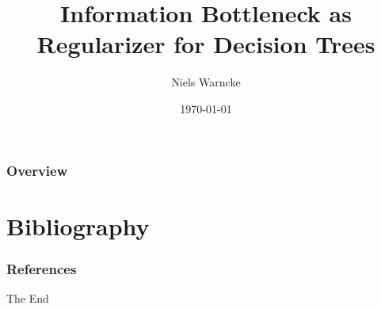 \documentclass{beamer}
\title[Information Bottleneck Decision Trees]{Information Bottleneck as Regularizer for Decision Trees} %
\author{Niels Warncke} %
\institute[TUB] %
{
Technische Universität Berlin \\ %
\medskip
\textit{niels.warncke@gmail.com} %
}
\date{\today} %
\begin{document}
\begin{frame}
\titlepage %
\end{frame}

\begin{frame}
\frametitle{Overview} %
\tableofcontents %
\end{frame}

%









\section{Bibliography}


\begin{frame}[t, allowframebreaks]
    \frametitle{References}
    
    
\end{frame}


\begin{frame}
\Huge{\centerline{The End}}
\end{frame}

\end{document}

